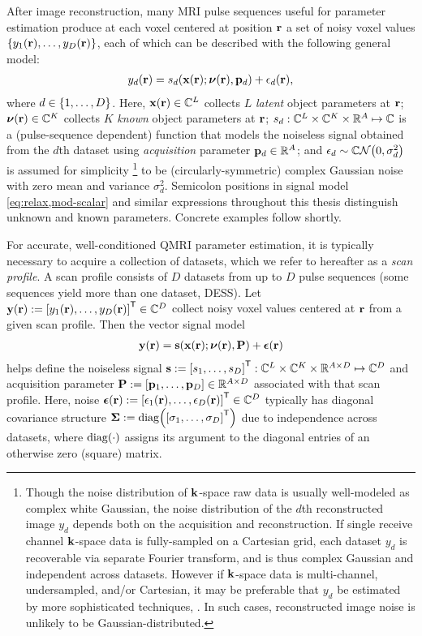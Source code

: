After image reconstruction,
many MRI pulse sequences
useful for parameter estimation
produce at each voxel 
centered at position $\mathbf{r}$
a set of noisy voxel values 
$\set{y_1\pr,\dots,y_D\pr}$, 
each of which can be described
with the following general model:
\begin{align}
	y_d\pr = s_d\paren{\bmx\pr; \bmnu\pr, \bmp_d} + \epsilon_d\pr,
	\label{eq:relax,mod-scalar}
\end{align}
where 
$d \in \set{1,\dots,D}$. 
Here,
$\bmx\pr \in \complexes{L}$ 
collects $L$ \emph{latent} object parameters at $\mathbf{r}$;
$\bmnu\pr \in \complexes{K}$ 
collects $K$ \emph{known} object parameters at $\mathbf{r}$;
$s_d : \mathbb{C}^{L} \times \mathbb{C}^{K} \times \mathbb{R}^{A} \mapsto \mathbb{C}$
is a (pulse-sequence dependent) function
that models the noiseless signal 
obtained from the $d$th dataset
using \emph{acquisition} parameter $\mathbf{p}_d \in \mathbb{R}^{A}$;
and $\epsilon_d \sim \cgauss{0}{\sigma_d^2}$ 
is assumed for simplicity 
\footnote{Though the noise distribution 
of $\mathbf{k}$-space raw data 
is usually well-modeled
as complex white Gaussian, 
the noise distribution 
of the $d$th reconstructed image $y_d$ depends both
on the acquisition and reconstruction.
If single receive channel $\mathbf{k}$-space data
is fully-sampled
on a Cartesian grid,
each dataset $y_d$ is recoverable
via separate Fourier transform,
and is thus complex Gaussian
and independent across datasets.
However if $\mathbf{k}$-space data
is multi-channel, undersampled, and/or Cartesian,
it may be preferable
that $y_d$ be estimated by more sophisticated techniques,
\eg \cite{fessler:03:nff, muckley:15:fpm}.
In such cases,
reconstructed image noise is unlikely
to be Gaussian-distributed.
}
to be (circularly-symmetric) complex Gaussian noise
\cite{macovski:96:nim, lei:07:som}
with zero mean and variance $\sigma_d^2$.
Semicolon positions 
in signal model \eqref{eq:relax,mod-scalar} 
and similar expressions throughout this thesis 
distinguish unknown and known parameters.
Concrete examples follow shortly.

For accurate, well-conditioned QMRI parameter estimation,
it is typically necessary 
to acquire a collection of datasets,
which we refer to hereafter as a \emph{scan profile}.
A scan profile consists 
of $D$ datasets
from up to $D$ pulse sequences
(some sequences yield more than one dataset, \eg DESS).
Let 
$\bmy\pr := \brac{y_1\pr, \dots, y_D\pr}\tpose \in \complexes{D}$
collect noisy voxel values centered at $\mathbf{r}$
from a given scan profile.
Then the vector signal model
\begin{align}
	\bmy\pr = \bms\paren{\bmx\pr; \bmnu\pr, \bmP} + \bmeps\pr
	\label{eq:relax,mod-vec}
\end{align}
helps define the noiseless signal 
$\bms := \brac{s_1, \dots, s_D}\tpose
: \complexes{L} \times \complexes{K} \times \reals{A \times D} \mapsto \complexes{D}$
and acquisition parameter
$\bmP := \brac{\bmp_1,\dots,\bmp_D} \in \reals{A \times D}$
associated with that scan profile.
Here, noise
$\bmeps\pr := \brac{\epsilon_1\pr, \dots, \epsilon_D\pr}\tpose \in \complexes{D}$
typically has diagonal covariance structure
$\bmSig := \diag{\brac{\sigma_1,\dots,\sigma_D}\tpose}$
due to independence across datasets,
where $\diag{\cdot}$ assigns its argument 
to the diagonal entries 
of an otherwise zero (square) matrix.

